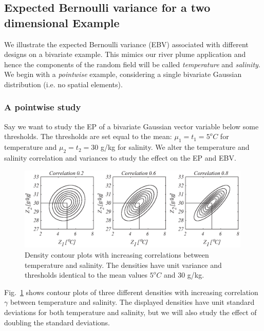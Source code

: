 \documentclass[aoas]{imsart}
\begin{document}
\subsection{Expected Bernoulli variance for a two dimensional Example}
\label{Sec:UnivarEx}

We illustrate the expected Bernoulli variance (EBV) associated with
different designs on a bivariate example. This mimics our river plume
application and hence the components of the random
field will be called \textit{temperature} and \textit{salinity}. We
begin with a \textit{pointwise} example, considering a single
bivariate Gaussian distribution (i.e. no spatial elements).

\subsubsection{A pointwise study}

Say we want to study the EP of a bivariate Gaussian
vector variable below some thresholds. The thresholds are set equal to the mean:
$\mu_1=t_1=5^o C$ for temperature and $\mu_2=t_2=30$ g/kg for
salinity. We alter the temperature and salinity correlation
and variances to study the effect on the EP and EBV.

\begin{figure}[!b] 
\centering
\includegraphics[width=0.99\textwidth]{Figures/illus_bivarNEW.eps}%
\caption{Density contour plots with increasing correlations between
  temperature and salinity. The densities have unit variance and
  thresholds identical to the mean values $5^o C$ and
  $30$ g/kg.}
\label{illus_bivarDens}
\end{figure}

Fig.~\ref{illus_bivarDens} shows contour plots of three different
densities with increasing correlation $\gamma$ between temperature and
salinity. The displayed densities have unit standard deviations for
both temperature and salinity, but we will also study the effect of
doubling the standard deviations.
\end{document}
